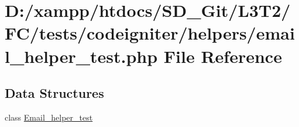 \hypertarget{tests_2codeigniter_2helpers_2email__helper__test_8php}{}\section{D\+:/xampp/htdocs/\+S\+D\+\_\+\+Git/\+L3\+T2/\+F\+C/tests/codeigniter/helpers/email\+\_\+helper\+\_\+test.php File Reference}
\label{tests_2codeigniter_2helpers_2email__helper__test_8php}
\subsection*{Data Structures}
\begin{DoxyCompactItemize}
\item 
class \hyperlink{class_email__helper__test}{Email\+\_\+helper\+\_\+test}
\end{DoxyCompactItemize}
